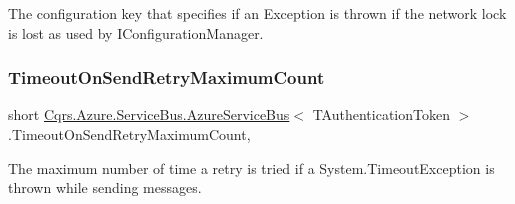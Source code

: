 The configuration key that specifies if an Exception is thrown if the network lock is lost as used by I\+Configuration\+Manager. 

\mbox{\label{classCqrs_1_1Azure_1_1ServiceBus_1_1AzureServiceBus_a4cc1f3523c56c534ff72c7da0e718482_a4cc1f3523c56c534ff72c7da0e718482}} 
\subsubsection{\texorpdfstring{Timeout\+On\+Send\+Retry\+Maximum\+Count}{TimeoutOnSendRetryMaximumCount}}
{\footnotesize\ttfamily short \hyperlink{classCqrs_1_1Azure_1_1ServiceBus_1_1AzureServiceBus}{Cqrs.\+Azure.\+Service\+Bus.\+Azure\+Service\+Bus}$<$ T\+Authentication\+Token $>$.Timeout\+On\+Send\+Retry\+Maximum\+Count\hspace{0.3cm}{\ttfamily [get]}, {\ttfamily [protected]}}



The maximum number of time a retry is tried if a System.\+Timeout\+Exception is thrown while sending messages. 

